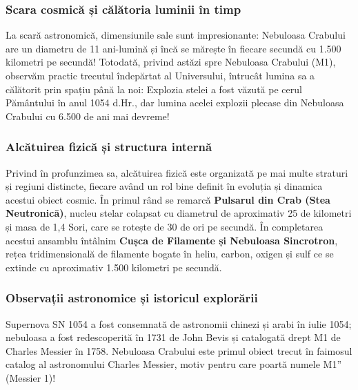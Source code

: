 \subsubsection*{Scara cosmică și călătoria luminii în timp}
La scară astronomică, dimensiunile sale sunt impresionante: Nebuloasa Crabului are un diametru de 11 ani-lumină și încă se mărește în fiecare secundă cu 1.500 kilometri pe secundă! Totodată, privind astăzi spre Nebuloasa Crabului (M1), observăm practic trecutul îndepărtat al Universului, întrucât lumina sa a călătorit prin spațiu până la noi: Explozia stelei a fost văzută pe cerul Pământului în anul 1054 d.Hr., dar lumina acelei explozii plecase din Nebuloasa Crabului cu 6.500 de ani mai devreme!

\subsubsection*{Alcătuirea fizică și structura internă}
Privind în profunzimea sa, alcătuirea fizică este organizată pe mai multe straturi și regiuni distincte, fiecare având un rol bine definit în evoluția și dinamica acestui obiect cosmic. În primul rând se remarcă \textbf{Pulsarul din Crab (Stea Neutronică)}, nucleu stelar colapsat cu diametrul de aproximativ 25 de kilometri și masa de 1,4 Sori, care se rotește de 30 de ori pe secundă. În completarea acestui ansamblu întâlnim \textbf{Cușca de Filamente și Nebuloasa Sincrotron}, rețea tridimensională de filamente bogate în heliu, carbon, oxigen și sulf ce se extinde cu aproximativ 1.500 kilometri pe secundă.

\subsubsection*{Observații astronomice și istoricul explorării}
Supernova SN 1054 a fost consemnată de astronomii chinezi și arabi în iulie 1054; nebuloasa a fost redescoperită în 1731 de John Bevis și catalogată drept M1 de Charles Messier în 1758. Nebuloasa Crabului este primul obiect trecut în faimosul catalog al astronomului Charles Messier, motiv pentru care poartă numele \quotedblbase{}M1\textquotedblright{} (Messier 1)!

